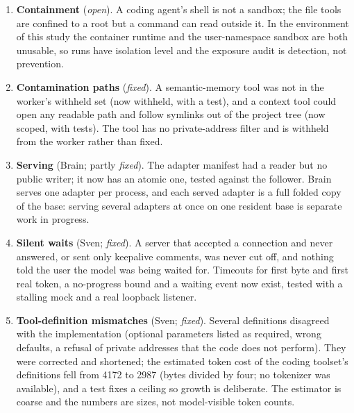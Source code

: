 \begin{enumerate}
check run tasks closed-book; a suite of workspace tasks would be unmeasured and fail the gate,
and text agreement between served and in-process answers is meaningless across multi-step runs.
\item \textbf{Containment} (\emph{open}). A coding agent's shell is not a sandbox; the file
tools are confined to a root but a command can read outside it. In the environment of this
study the container runtime and the user-namespace sandbox are both unusable, so runs have
isolation level  and the exposure audit is detection, not prevention.
\item \textbf{Contamination paths} (\emph{fixed}). A semantic-memory tool was not in the
worker's withheld set (now withheld, with a test), and a context tool could open any readable
path and follow symlinks out of the project tree (now scoped, with tests). The 
tool has no private-address filter and is withheld from the worker rather than fixed.
\item \textbf{Serving} (Brain; partly \emph{fixed}). The adapter manifest had a reader but no
public writer; it now has an atomic one, tested against the follower. Brain serves one adapter
per process, and each served adapter is a full folded copy of the base: serving several
adapters at once on one resident base is separate work in progress.
\item \textbf{Silent waits} (Sven; \emph{fixed}). A server that accepted a connection and
never answered, or sent only keepalive comments, was never cut off, and nothing told the user
the model was being waited for. Timeouts for first byte and first real token, a no-progress
bound and a waiting event now exist, tested with a stalling mock and a real loopback listener.
\item \textbf{Tool-definition mismatches} (Sven; \emph{fixed}). Several definitions disagreed
with the implementation (optional parameters listed as required, wrong defaults, a refusal of
private addresses that the code does not perform). They were corrected and shortened; the
estimated token cost of the coding toolset's definitions fell from 4172 to 2987 (bytes divided
by four; no tokenizer was available), and a test fixes a ceiling so growth is deliberate. The
estimator is coarse and the numbers are sizes, not model-visible token counts.
\end{enumerate}
